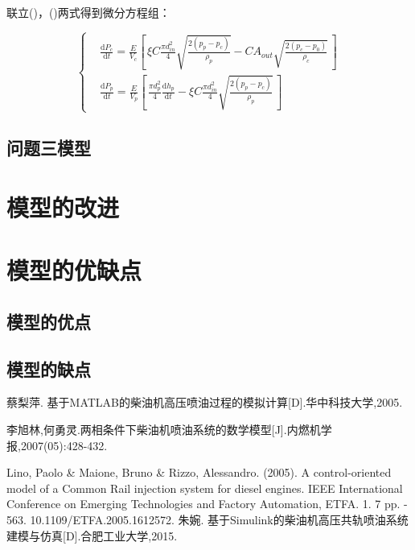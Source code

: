 \documentclass[withoutpreface,bwprint]{cumcmthesis} %
\begin{document}
			联立()，()两式得到微分方程组：
			
			\begin{equation} \left\{\begin{aligned}&\frac{\mathrm{d}P_c}{\mathrm{d}t} = \frac{E}{V_c} \left[ \, \xi C \frac{\pi d_{in}^2}{4} \sqrt{\frac{2(p_p - p_c)}{\rho_p}} - CA_{out} \sqrt{\frac{2(p_c - p_0)}{\rho_c}} \, \right] \\&\frac{\mathrm{d}P_p}{\mathrm{d}t} = \frac{E}{V_p} \left[ \, \frac{\pi d_p^2}{4}  \frac{\mathrm{d}h_p}{\mathrm{d}t} - \xi C \frac{\pi d_{in}^2}{4} \sqrt{\frac{2(p_p - p_c)}{\rho_p}} \, \right]\end{aligned}\right. \end{equation}
			\subsection{问题三模型}
			
			
			\section{模型的改进}
			
			
			\section{模型的优缺点}
			\subsection{模型的优点}
			
			\subsection{模型的缺点}
			
			
			
			\begin{thebibliography}{9}%
				 蔡梨萍. 基于MATLAB的柴油机高压喷油过程的模拟计算[D].华中科技大学,2005.
				
				李旭林,何勇灵.两相条件下柴油机喷油系统的数学模型[J].内燃机学报,2007(05):428-432.
				
				Lino, Paolo \& Maione, Bruno \& Rizzo, Alessandro. (2005). A control-oriented model of a Common Rail injection system for diesel engines. IEEE International Conference on Emerging Technologies and Factory Automation, ETFA. 1. 7 pp. - 563. 10.1109/ETFA.2005.1612572. 
				朱婉. 基于Simulink的柴油机高压共轨喷油系统建模与仿真[D].合肥工业大学,2015.
				
				
			\end{thebibliography}
			
\end{document}
